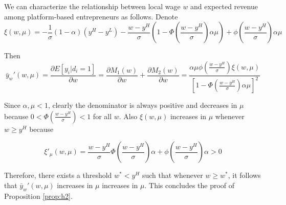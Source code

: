 \documentclass[letterpaper,12pt]{article}
\newtheorem{proposition}{Proposition}
\newtheorem{lemma}{Lemma}
\begin{document}
We can characterize the relationship between local wage $w$ and expected revenue among platform-based entrepreneurs as follows. Denote
$$\xi(w,\mu) = -\frac{1}{\sigma}(1-\alpha)(y^{H}-y^{L})-\frac{w-y^{H}}{\sigma}\left(1-\Phi\left(\frac{w-y^{H}}{\sigma}\right)\alpha\mu\right)+\phi\left(\frac{w-y^{H}}{\sigma}\right)\alpha\mu$$

Then
\begin{equation}
\bar{y}_{w}'(w,\mu) = \frac{\partial E\left[y_{i}\vert d_{i}=1\right]}{\partial w} = \frac{\partial M_{1}(w)}{\partial w} + \frac{\partial M_{2}(w)}{\partial w}= \frac{\alpha\mu\phi\left(\frac{w-y^{H}}{\sigma}\right)\xi(w,\mu)}{\left[1-\Phi\left(\frac{w-y^{H}}{\sigma}\right)\alpha\mu\right]^{2}}
\end{equation}



Since $\alpha,\mu<1$, clearly the denominator is always positive and decreases in $\mu$ because $0<\Phi(\frac{w-y^{H}}{\sigma})<1$ for all $w$. Also $\xi(w,\mu)$ increases in $\mu$ whenever $w\geq y^{H}$ because

$$\xi'_{\mu}(w,\mu)=\frac{w-y^{H}}{\sigma}\Phi\left(\frac{w-y^{H}}{\sigma}\right)\alpha+\phi\left(\frac{w-y^{H}}{\sigma}\right)\alpha>0$$

Therefore, there exists a threshold $w^{*}<y^{H}$ such that whenever $w\geq w^{*}$, it follows that $\bar{y}_{w}'(w,\mu)$ increases in $\mu$ increases in $\mu$. This concludes the proof of Proposition \ref{prop:h2}.



%


\end{document}
